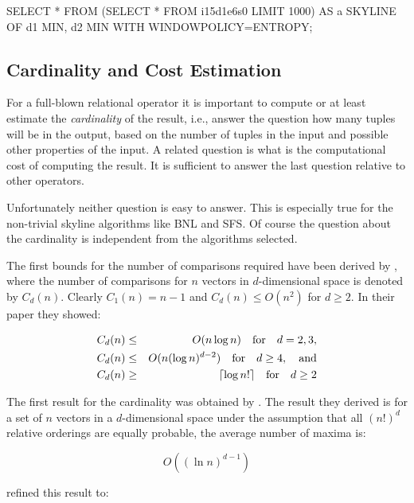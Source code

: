 \begin{interactive}
SELECT * 
FROM 
    (SELECT * FROM i15d1e6s0 LIMIT 1000) AS a 
SKYLINE OF d1 MIN, d2 MIN WITH WINDOWPOLICY=ENTROPY;
\end{interactive}


\enlargethispage{\baselineskip}
\subsection{Cardinality and Cost Estimation}
\label{sec:cardinality-and-cost-estimation}
For a full-blown relational operator it is important to compute or at
least estimate the \emph{cardinality} of the result, i.e., answer the
question how many tuples will be in the output, based on the number of
tuples in the input and possible other properties of the input.  A
related question is what is the computational cost of computing the
result.  It is sufficient to answer the last question relative to
other operators.  

Unfortunately neither question is easy to answer.  This is especially true for the
non-trivial skyline algorithms like BNL and SFS. Of course
the question about the cardinality is independent from the algorithms
selected.

The first bounds for the number of comparisons required have been
derived by \citet{Kung1975}, where the number of comparisons for
$n$ vectors in $d$-dimensional space is denoted by $C_d(n)$. 
Clearly $C_1(n) = n - 1$ and $C_d(n) \le O(n^2)$ for $d \ge 2$.
In their paper they showed:

\begin{eqnarray}
C_d(n) &\le& O(n \log n) \quad \textnormal{for} \quad d = 2, 3, \\
C_d(n) &\le& O(n (\log n)^{d-2}) \quad \textnormal{for} \quad d \ge 4, \quad \textnormal{and} \\
C_d(n) &\ge& \lceil\log n!\rceil \quad \textnormal{for} \quad d \ge 2
\end{eqnarray}

The first result for the cardinality was obtained by
\cite{Bentley1978}.  The result they derived is for a set of $n$ vectors
in a $d$-dimensional space under the assumption that all $(n!)^d$
relative orderings are equally probable, the average number of maxima
is:

\begin{equation}
O((\ln n)^{d-1})
\end{equation}

\noindent
\citet{Buchta1989} refined this result to:

